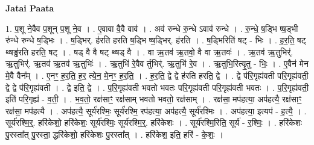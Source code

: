 \documentclass[17pt]{extarticle}
\begin{document}
\textbf{Jatai Paata} \newline

1. प॒शू ने॒वैव प॒शून् प॒शू ने॒व । . ए॒वावा वै॒वै वाव॑ । . अव॑ रुन्धे रु॒न्धे ऽवाव॑ रुन्धे । . रु॒न्धे॒ ष॒ड्भि ष्ष॒ड्भी रु॑न्धे रुन्धे ष॒ड्भिः । . ष॒ड्भिर्. ह॑रति हरति ष॒ड्भि ष्ष॒ड्भिर्. ह॑रति । . ष॒ड्भिरिति॑ षट् - भिः । . ह॒र॒ति॒ षट् थ्षड्ढ॑रति हरति॒ षट् । . षड् वै वै षट् थ्षड् वै । . वा ऋ॒तव॑ ऋ॒तवो॒ वै वा ऋ॒तवः॑ । . ऋ॒तव॑ ऋ॒तुभिर्॑. ऋ॒तुभिर्॑. ऋ॒तव॑ ऋ॒तव॑ ऋ॒तुभिः॑ । . ऋ॒तुभि॑ रे॒वैव र्तुभिर्॑. ऋ॒तुभि॑ रे॒व । . ऋ॒तुभि॒रित्यृ॒तु - भिः॒ । . ए॒वैन॑ मेन मे॒वै वैन᳚म् । . ए॒नꣳ॒॒ ह॒र॒ति॒ ह॒र॒ त्ये॒न॒ मे॒नꣳ॒॒ ह॒र॒ति॒ । . ह॒र॒ति॒ द्वे द्वे ह॑रति हरति॒ द्वे । . द्वे प॑रि॒गृह्य॑वती परि॒गृह्य॑वती॒ द्वे द्वे प॑रि॒गृह्य॑वती । . द्वे इति॒ द्वे । . प॒रि॒गृह्य॑वती भवतो भवतः परि॒गृह्य॑वती परि॒गृह्य॑वती भवतः । . प॒रि॒गृह्य॑वती॒ इति॑ परि॒गृह्य॑ - व॒ती॒ । . भ॒व॒तो॒ रक्ष॑साꣳ॒॒ रक्ष॑साम् भवतो भवतो॒ रक्ष॑साम् । . रक्ष॑सा॒ मप॑हत्या॒ अप॑हत्यै॒ रक्ष॑साꣳ॒॒ रक्ष॑सा॒ मप॑हत्यै । . अप॑हत्यै॒ सूर्य॑रश्मिः॒ सूर्य॑रश्मि॒ रप॑हत्या॒ अप॑हत्यै॒ सूर्य॑रश्मिः । . अप॑हत्या॒ इत्यप॑ - ह॒त्यै॒ । . सूर्य॑रश्मि॒र्॒. हरि॑केशो॒ हरि॑केशः॒ सूर्य॑रश्मिः॒ सूर्य॑रश्मि॒र्॒. हरि॑केशः । . सूर्य॑रश्मि॒रिति॒ सूर्य॑ - र॒श्मिः॒ । . हरि॑केशः पु॒रस्ता᳚त् पु॒रस्ता॒ द्धरि॑केशो॒ हरि॑केशः पु॒रस्ता᳚त् । . हरि॑केश॒ इति॒ हरि॑ - के॒शः॒ । \newline
\end{document}
